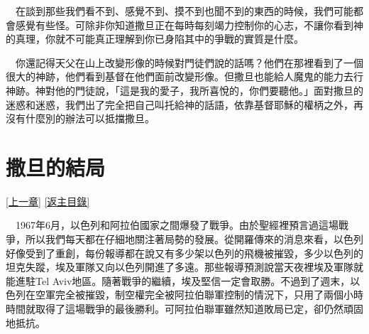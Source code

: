 \documentclass{book}
\begin{document}
　在談到那些我們看不到、感覺不到、摸不到也聞不到的東西的時候，我們可能都會感覺有些怪。可除非你知道撒旦正在每時每刻竭力控制你的心志，不讓你看到神的真理，你就不可能真正理解到你已身陷其中的爭戰的實質是什麼。

　你還記得天父在山上改變形像的時候對門徒們說的話嗎？他們在那裡看到了一個很大的神跡，他們看到基督在他們面前改變形像。但撒旦也能給人魔鬼的能力去行神跡。神對他的門徒說，「這是我的愛子，我所喜悅的，你們要聽他。」面對撒旦的迷惑和迷惑，我們出了完全把自己叫托給神的話語，依靠基督耶穌的權柄之外，再沒有什麼別的辦法可以抵擋撒旦。

\chapter{撒旦的結局}
\label{sec:ch20}
\hyperref[sec:ch19]{[上一章]}
\hyperlink{toc}{[返主目錄]}

\begin{center}
\noindent{}
\end{center}

　1967年6月，以色列和阿拉伯國家之間爆發了戰爭。由於聖經裡預言過這場戰爭，所以我們每天都在仔細地關注著局勢的發展。從開羅傳來的消息來看，以色列好像受到了重創，每份報導都在說又有多少架以色列的飛機被摧毀，多少以色列的坦克失蹤，埃及軍隊又向以色列開進了多遠。那些報導預測說當天夜裡埃及軍隊就能進駐Tel Aviv地區。隨著戰爭的繼續，埃及堅信一定會取勝。不過到了週末，以色列在空軍完全被摧毀，制空權完全被阿拉伯聯軍控制的情況下，只用了兩個小時時間就取得了這場戰爭的最後勝利。可阿拉伯聯軍雖然知道敗局已定，卻仍然頑固地抵抗。
\end{document}
